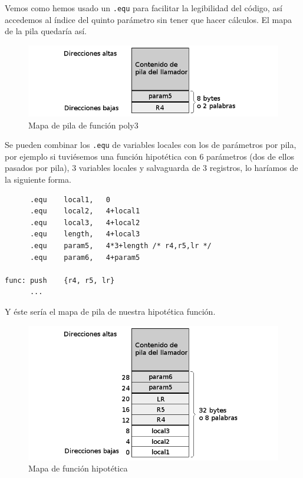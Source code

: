 Vemos como hemos usado un {\tt .equ} para facilitar la legibilidad del código, así
accedemos al índice del quinto parámetro sin tener que hacer cálculos. El mapa de la
pila quedaría así.

\begin{figure}[h]
  \centering
    \includegraphics[width=14cm]{graphs/pila3.png}
  \caption{Mapa de pila de función poly3}
  \label{fig:pila3}
\end{figure}

Se pueden combinar los {\tt .equ} de variables locales con los de parámetros por pila,
por ejemplo si tuviésemos una función hipotética con 6 parámetros (dos de ellos pasados
por pila), 3 variables locales y salvaguarda de 3 registros, lo haríamos de la
siguiente forma.

\begin{lstlisting}
      .equ    local1,   0
      .equ    local2,   4+local1
      .equ    local3,   4+local2
      .equ    length,   4+local3
      .equ    param5,   4*3+length /* r4,r5,lr */
      .equ    param6,   4+param5

func: push    {r4, r5, lr}
      ...
\end{lstlisting}

Y éste sería el mapa de pila de nuestra hipotética función.

\begin{figure}[h]
  \centering
    \includegraphics[width=14cm]{graphs/pila4.png}
  \caption{Mapa de función hipotética}
  \label{fig:pila4}
\end{figure}


